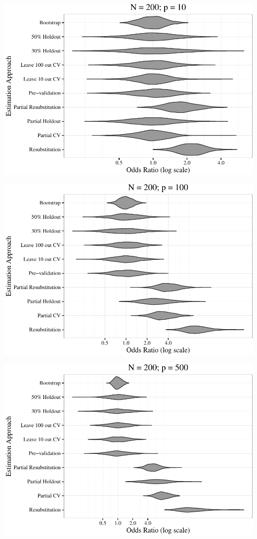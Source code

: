 \documentclass[11pt,]{article}
\begin{document}
\includegraphics{supplement_files/figure-latex/plots2-4.pdf} \clearpage

\includegraphics{supplement_files/figure-latex/plots2-5.pdf} \clearpage

\includegraphics{supplement_files/figure-latex/plots2-6.pdf} \clearpage
\end{document}

